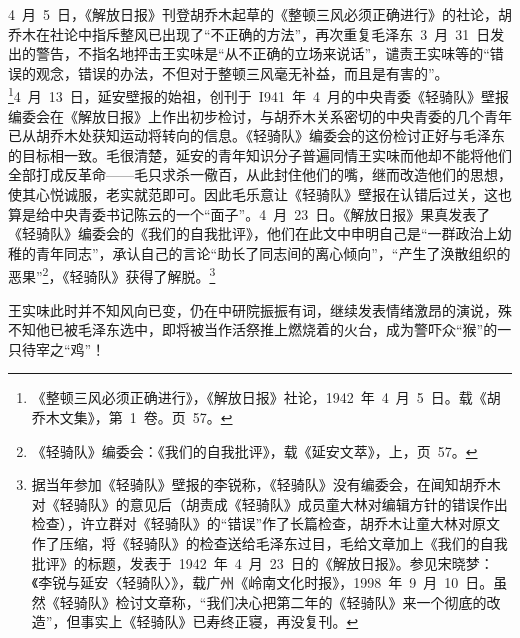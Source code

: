 4~月~5~日，《解放日报》刊登胡乔木起草的《整顿三风必须正确进行》的社论，胡乔木在社论中指斥整风已出现了“不正确的方法”，再次重复毛泽东~3~月~31~日发出的警告，不指名地抨击王实味是“从不正确的立场来说话”，谴责王实味等的“错误的观念，错误的办法，不但对于整顿三风毫无补益，而且是有害的”。\footnote{《整顿三风必须正确进行》，《解放日报》社论，1942~年~4~月~5~日。载《胡乔木文集》，第~1~卷。页~57。}4~月~13~日，延安壁报的始祖，创刊于~I941~年~4~月的中央青委《轻骑队》壁报编委会在《解放日报》上作出初步检讨，与胡乔木关系密切的中央青委的几个青年已从胡乔木处获知运动将转向的信息。《轻骑队》编委会的这份检讨正好与毛泽东的目标相一致。毛很清楚，延安的青年知识分子普遍同情王实味而他却不能将他们全部打成反革命——毛只求杀一儆百，从此封住他们的嘴，继而改造他们的思想，使其心悦诚服，老实就范即可。因此毛乐意让《轻骑队》壁报在认错后过关，这也算是给中央青委书记陈云的一个“面子”。4~月~23~日。《解放日报》果真发表了《轻骑队》编委会的《我们的自我批评》，他们在此文中申明自己是“一群政治上幼稚的青年同志”，承认自己的言论“助长了同志间的离心倾向”，“产生了涣散组织的恶果”\footnote{《轻骑队》编委会：《我们的自我批评》，载《延安文萃》，上，页~57。}，《轻骑队》获得了解脱。\footnote{据当年参加《轻骑队》壁报的李锐称，《轻骑队》没有编委会，在闻知胡乔木对《轻骑队》的意见后（胡责成《轻骑队》成员童大林对编辑方针的错误作出检查），许立群对《轻骑队》的“错误”作了长篇检查，胡乔木让童大林对原文作了压缩，将《轻骑队》的检查送给毛泽东过目，毛给文章加上《我们的自我批评》的标题，发表于~1942~年~4~月~23~日的《解放日报》。参见宋晓梦：《李锐与延安〈轻骑队〉》，载广州《岭南文化时报》，1998~年~9~月~10~日。虽然《轻骑队》检讨文章称，“我们决心把第二年的《轻骑队》来一个彻底的改造”，但事实上《轻骑队》已寿终正寝，再没复刊。}

王实味此时并不知风向已变，仍在中研院振振有词，继续发表情绪激昂的演说，殊不知他已被毛泽东选中，即将被当作活祭推上燃烧着的火台，成为警吓众“猴”的一只待宰之“鸡”！

